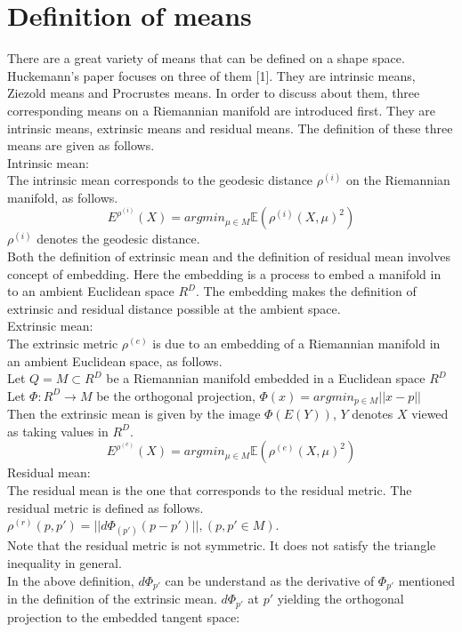 \documentclass[12pt]{article}
\theoremstyle{definition}
\theoremstyle{remark}
\numberwithin{equation}{section}
\begin{document}
\section{Definition of means}
There are a great variety of means that can be defined on a shape space. Huckemann's paper focuses on three of them [1]. They are intrinsic means, Ziezold means and Procrustes means. In order to discuss about them, three corresponding means on a Riemannian manifold are introduced first. They are intrinsic means, extrinsic means and residual means. The definition of these three means are given as follows.\\[0.2cm]
Intrinsic mean:\\[0.2cm]
The intrinsic mean corresponds to the geodesic distance $\rho^{(i)}$ on the Riemannian manifold, as follows. 
\[E^{\rho^{(i)}}(X)=argmin_{\mu\in M}\mathbb{E}(\rho^{(i)}(X,\mu)^2)\]
$\rho^{(i)}$ denotes the geodesic distance.\\[0.2cm]
\indent Both the definition of extrinsic mean and the definition of residual mean involves concept of embedding. Here the embedding is a process to embed a manifold in to an ambient Euclidean space $R^D$. The embedding makes the definition of extrinsic and residual distance possible at the ambient space.\\[0.2cm]
Extrinsic mean:\\[0.2cm]
The extrinsic metric $\rho^{(e)}$ is due to an embedding of a Riemannian manifold in an ambient Euclidean space, as follows.\\[0.2cm]
Let $Q = M \subset R^D$ be a Riemannian manifold embedded in a Euclidean space $R^D$\\
Let $\Phi: R^D \rightarrow M$  be the orthogonal projection, $\Phi(x) = argmin_{p\in M}||x-p||$ \\ [0.2cm]
Then the extrinsic mean is given by the image $\Phi(E(Y))$, $Y$ denotes $X$ viewed as taking values in $R^D$.
\[E^{\rho^{(e)}}(X)=argmin_{\mu\in M}\mathbb{E}(\rho^{(e)}(X,\mu)^2)\]
Residual mean:\\[0.2cm]
The residual mean is the one that corresponds to the residual metric. The residual metric is defined as follows.\\[0.2cm]
$\rho^{(r)}(p,p')=||d\Phi_(p')(p-p')||,(p,p'\in M)$.\\[0.2cm]
\indent Note that the residual metric is not symmetric. It does not satisfy the triangle inequality in general. \\[0.2cm]
\indent In the above definition, $d\Phi_{p'}$ can be understand as the derivative of $\Phi_{p'}$ mentioned in the definition of the extrinsic mean. $d\Phi_{p'}$ at $p'$ yielding the orthogonal projection to the embedded tangent space:
\end{document}
